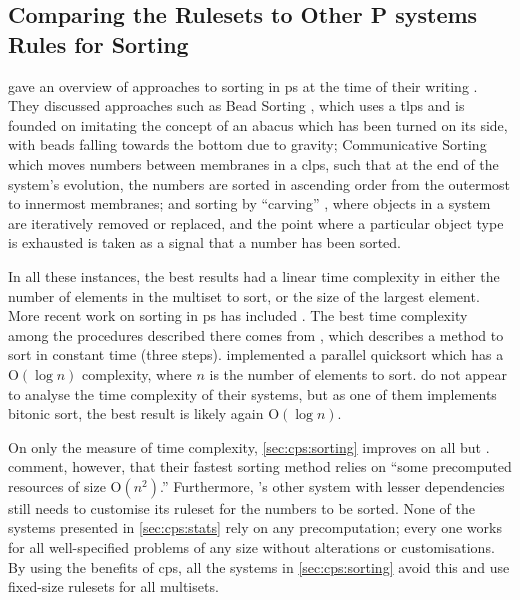 \subsection{Comparing the  Rulesets to Other P systems Rules for Sorting}

\citeauthor{Ceterchi2010} gave an overview of approaches to sorting in \gls{ps} at the time of their writing \cite{Ceterchi2010}.  They discussed approaches such as Bead Sorting \cite{Arulanandham2002}, which uses a \gls{tlps} and is founded on imitating the concept of an abacus which has been turned on its side, with beads falling towards the bottom due to gravity; Communicative Sorting \cite[Sec. 5.2]{Alhazov2007} which moves numbers between membranes in a \gls{clps}, such that at the end of the system's evolution, the numbers are sorted in ascending order from the outermost to innermost membranes; and sorting by ``carving'' \cite{Alhazov2007}, where objects in a system are iteratively removed or replaced, and the point where a particular object type is exhausted is taken as a signal that a number has been sorted.

In all these instances, the best results had a linear time complexity in either the number of elements in the multiset to sort, or the size of the largest element.  More recent work on sorting in \gls{ps} has included \cite{Gheorghe2017,Metta2015,Yan2019}.  The best time complexity among the procedures described there comes from \cite[Sec. 3.3]{Gheorghe2017}, which describes a method to sort in constant time (three steps).  \citeauthor{Yan2019} \cite{Yan2019} implemented a parallel quicksort which has a O\((\log n)\) complexity, where \(n\) is the number of elements to sort.  \citeauthor{Metta2015} \cite{Metta2015} do not appear to analyse the time complexity of their systems, but as one of them implements bitonic sort, the best result is likely again O\((\log n)\).

On only the measure of time complexity, \cref{sec:cps:sorting} improves on all but \cite{Gheorghe2017}.  \citeauthor{Gheorghe2017} comment, however, that their fastest sorting method relies on ``some precomputed resources of size O\((n^2)\).''  Furthermore, \cite{Gheorghe2017}'s other system with lesser dependencies still needs to customise its ruleset for the numbers to be sorted.  None of the systems presented in \cref{sec:cps:stats} rely on any precomputation; every one works for all well-specified problems of any size without alterations or customisations.  By using the benefits of \gls{cps}, all the systems in \cref{sec:cps:sorting} avoid this and use fixed-size rulesets for all multisets.

